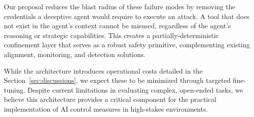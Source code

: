 \documentclass{article}
\theoremstyle{plain}
\theoremstyle{definition}
\theoremstyle{remark}
\begin{document}
Our proposal reduces the blast radius of these failure modes by removing the credentials a deceptive agent would require to execute an attack. A tool that does not exist in the agent's context cannot be misused, regardless of the agent's reasoning or strategic capabilities. This creates a partially-deterministic confinement layer that serves as a robust safety primitive, complementing existing alignment, monitoring, and detection solutions.

While the architecture introduces operational costs detailed in the Section~\ref{sec:discussions}, we expect these to be minimized through targeted fine-tuning. Despite current limitations in evaluating complex, open-ended tasks, we believe this architecture provides a critical component for the practical implementation of AI control measures in high-stakes environments.

\newif\ifaccepted
\acceptedfalse %

\ifaccepted
\section*{Acknowledgements}
The author would like to thank the organizers and community of the AI Security Bootcamp (AISB) Singapore for the technical discussions and threat modeling exercises that informed the Three-Source Architecture. Additional thanks go to BlueDot Impact for the research environment and mentorship provided during the project development. All views expressed are solely those of the author and do not represent the positions of his employer.
\fi




\end{document}
